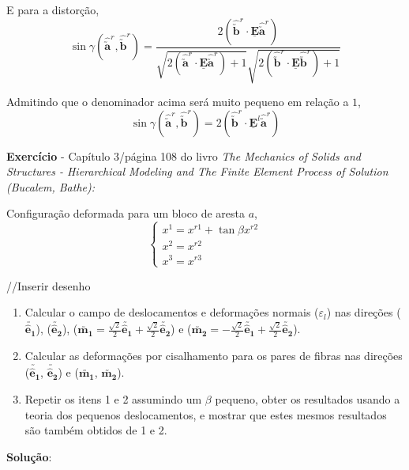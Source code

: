 	E para a distorção,
	\[\sin\gamma(\hat{\utilde{\mathbf{a}}}^r, \hat{\utilde{\mathbf{b}}}^r)=\frac{2(\hat{\utilde{\mathbf{b}}}^r\cdot\underline{\mathbf{E}}\hat{\utilde{\mathbf{a}}}^r)}{\sqrt{2(\hat{\utilde{\mathbf{a}}}^r\cdot\underline{\mathbf{E}}\hat{\utilde{\mathbf{a}}}^r)+1}\sqrt{2(\hat{\utilde{\mathbf{b}}}^r\cdot\underline{\mathbf{E}}\hat{\utilde{\mathbf{b}}}^r)+1}}\]
	
	Admitindo que o denominador acima será muito pequeno em relação a $1$,
	\[\sin\gamma(\hat{\utilde{\mathbf{a}}}^r, \hat{\utilde{\mathbf{b}}}^r)=2(\hat{\utilde{\mathbf{b}}}^r\cdot\underline{\mathbf{E}}^l\hat{\utilde{\mathbf{a}}}^r)\]
	
	\textbf{Exercício} - Capítulo 3/página 108 do livro \textit{The Mechanics of Solids and Structures - Hierarchical Modeling and The Finite Element Process of Solution (Bucalem, Bathe):}
	
	Configuração deformada para um bloco de aresta $a$,
	\[
	\begin{cases}
		x^1=x^{r1}+\tan\beta x^{r2} \\ x^2=x^{r2} \\ x^3=x^{r3}
	\end{cases}
	\]
	
	//Inserir desenho
	
	\begin{enumerate}
		\item Calcular o campo de deslocamentos e deformações normais ($\varepsilon_l$) nas direções ($\utilde{\mathbf{\hat{e}_1}}$), ($\utilde{\mathbf{\hat{e}_2}}$), ($\utilde{\mathbf{m_1}}=\frac{\sqrt{2}}{2}\utilde{\mathbf{\hat{e}_1}}+\frac{\sqrt{2}}{2}\utilde{\mathbf{\hat{e}_2}}$) e ($\utilde{\mathbf{m_2}}=-\frac{\sqrt{2}}{2}\utilde{\mathbf{\hat{e}_1}}+\frac{\sqrt{2}}{2}\utilde{\mathbf{\hat{e}_2}}$).
	\item Calcular as deformações por cisalhamento para os pares de fibras nas direções ($\utilde{\mathbf{\hat{e}_1}}$, $\utilde{\mathbf{\hat{e}_2}}$) e ($\utilde{\mathbf{m_1}}$, $\utilde{\mathbf{m_2}}$).
	\item Repetir os itens 1 e 2 assumindo um $\beta$ pequeno, obter os resultados usando a teoria dos pequenos deslocamentos, e mostrar que estes mesmos resultados são também obtidos de 1 e 2.
	\end{enumerate}
	
	\textbf{Solução}:
	
